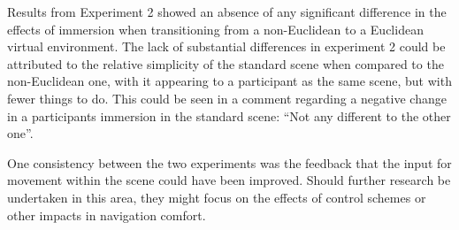 		Results from Experiment 2 showed an absence of any significant difference in the effects of immersion when transitioning from a non-Euclidean to a Euclidean virtual environment.
		The lack of substantial differences in experiment 2 could be attributed to the relative simplicity of the standard scene when compared to the non-Euclidean one, with it appearing to a participant as the same scene, but with fewer things to do.
		This could be seen in a comment regarding a negative change in a participants immersion in the standard scene: \enquote{Not any different to the other one}.

		One consistency between the two experiments was the feedback that the input for movement within the scene could have been improved.
		Should further research be undertaken in this area, they might focus on the effects of control schemes or other impacts in navigation comfort.

